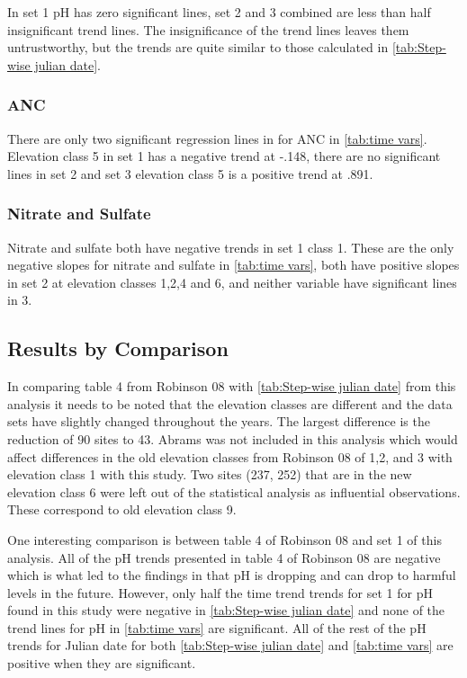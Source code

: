 In set 1 pH has zero significant lines, set 2 and 3 combined are less than half insignificant trend lines.  The insignificance of the trend lines leaves them untrustworthy, but the trends are quite similar to those calculated in \autoref{tab:Step-wise julian date}.

\subsubsection{ANC}

There are only two significant regression lines in for ANC in \autoref{tab:time vars}.  Elevation class 5 in set 1 has a negative trend at -.148, there are no significant lines in set 2 and set 3 elevation class 5 is a positive trend at .891.  

\subsubsection{Nitrate and Sulfate}

Nitrate and sulfate both have negative trends in set 1 class 1.  These are the only negative slopes for nitrate and sulfate in \autoref{tab:time vars}, both have positive slopes in set 2 at elevation classes 1,2,4 and 6, and neither variable have significant lines in 3.


\subsection{Results by Comparison}

In comparing table 4 from Robinson 08 with \autoref{tab:Step-wise julian date} from this analysis it needs to be noted that the elevation classes are different and the data sets have slightly changed throughout the years.  The largest difference is the reduction of 90 sites to 43.  Abrams was not included in this analysis which would affect differences in the old elevation classes from Robinson 08 of 1,2, and 3 with elevation class 1 with this study.  Two sites (237, 252) that are in the new elevation class 6 were left out of the statistical analysis as influential observations.  These correspond to old elevation class 9.

One interesting comparison is between table 4 of Robinson 08 and set 1 of this analysis.  All of the pH trends presented in table 4 of Robinson 08 are negative which is what led to the findings in \citet{robinson2008ph} that pH is dropping and can drop to harmful levels in the future.  However, only half the time trend trends for set 1 for pH found in this study were negative in \autoref{tab:Step-wise julian date} and none of the trend lines for pH in \autoref{tab:time vars} are significant.  All of the rest of the pH trends for Julian date for both \autoref{tab:Step-wise julian date} and \autoref{tab:time vars} are positive when they are significant.

